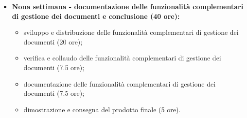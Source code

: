 {\begin{itemize}
\begin{itemize}
            \item progettazione delle funzionalità complementari di gestione dei documenti (7.5 ore);
            \item realizzazione delle funzionalità complementari di gestione dei documenti (20 ore).
        \end{itemize}
        \item \textbf{Nona settimana - documentazione delle funzionalità complementari di gestione dei documenti e conclusione (40 ore):} 
        \begin{itemize}
            \item sviluppo e distribuzione delle funzionalità complementari di gestione dei documenti (20 ore);
            \item verifica e collaudo delle funzionalità complementari di gestione dei documenti (7.5 ore);
            \item documentazione delle funzionalità complementari di gestione dei documenti (7.5 ore);
            \item dimostrazione e consegna del prodotto finale (5 ore).
        \end{itemize}
    \end{itemize}
}

\newcommand{\totaleOre}{320}

\newcommand{\obiettiviObbligatori}{
    \item \underline{\textit{O01}}: formazione sui domini coinvolti nel progetto;
	 \item \underline{\textit{O02}}: progettazione e realizzazione del protocollo Smart Contract;
	 \item \underline{\textit{O03}}: progettazione e realizzazione della dApp di notarizzazione;
	 \item \underline{\textit{O04}}: progettazione e realizzazione dell'interfaccia di testing e monitoraggio;
}

\newcommand{\obiettiviDesiderabili}{
	 \item \underline{\textit{D01}}: documentazione del protocollo Smart Contract;
	 \item \underline{\textit{D02}}: documentazione della dApp di notarizzazione;
	 \item \underline{\textit{D03}}: documentazione dell'interfaccia di testing e monitoraggio;
}

\newcommand{\obiettiviFacoltativi}{
	 \item \underline{\textit{F01}}: progettazione e realizzazione delle funzionalità complementari di gestione dei documenti;
	 \item \underline{\textit{F02}}: documentazione delle funzionalità complementari di gestione dei documenti;
}